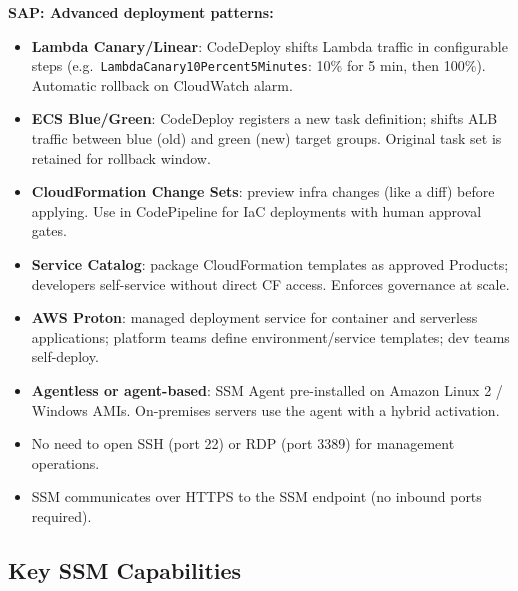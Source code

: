 \begin{sapdepth}
\textbf{SAP: Advanced deployment patterns:}
\begin{itemize}
  \item \textbf{Lambda Canary/Linear}: CodeDeploy shifts Lambda traffic in configurable steps
        (e.g.\ \texttt{LambdaCanary10Percent5Minutes}: 10\% for 5 min, then 100\%). Automatic rollback
        on CloudWatch alarm.
  \item \textbf{ECS Blue/Green}: CodeDeploy registers a new task definition; shifts ALB traffic
        between blue (old) and green (new) target groups. Original task set is retained for rollback window.
  \item \textbf{CloudFormation Change Sets}: preview infra changes (like a diff) before applying.
        Use in CodePipeline for IaC deployments with human approval gates.
  \item \textbf{Service Catalog}: package CloudFormation templates as approved Products;
        developers self-service without direct CF access. Enforces governance at scale.
  \item \textbf{AWS Proton}: managed deployment service for container and serverless applications;
        platform teams define environment/service templates; dev teams self-deploy.
\end{itemize}
\end{sapdepth}



\begin{keyfacts}
\begin{itemize}
  \item \textbf{Agentless or agent-based}: SSM Agent pre-installed on Amazon Linux 2 / Windows AMIs.
        On-premises servers use the agent with a hybrid activation.
  \item No need to open SSH (port 22) or RDP (port 3389) for management operations.
  \item SSM communicates over HTTPS to the SSM endpoint (no inbound ports required).
\end{itemize}
\end{keyfacts}

\subsection{Key SSM Capabilities}

